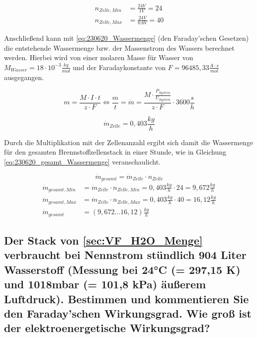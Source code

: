 \begin{align}
    n_{Zelle,Min} &= \frac{24V}{1V} = 24 \nonumber\\
    n_{Zelle,Max} &= \frac{24V}{0.6V} = 40 \nonumber
\end{align}

Anschließend kann mit \autoref{eq:230620_Wassermenge} (den Faraday'schen Gesetzen) die entstehende Wassermenge bzw. der Massenstrom des Wassers berechnet werden.
Hierbei wird von einer molaren Masse für Wasser von $M_{Wasser} = 18 \cdot 10^{-3} \frac{kg}{mol}$ und der Faradaykonstante von $F =96485,33 \frac{A\cdot s}{mol}$ ausgegangen.

\begin{equation}
    m = \frac{M \cdot I \cdot t}{z \cdot F} \Leftrightarrow \frac{m}{t} = \dot{m} = \frac{M \cdot \frac{P_{System}}{U_{System}}}{z \cdot F} \cdot 3600 \frac{s}{h}
    \label{eq:230620_Wassermenge}
\end{equation}

$$\dot{m}_{Zelle} = 0,403 \frac{kg}{h}$$

Durch die Multiplikation mit der Zellenanzahl ergibt sich damit die Wassermenge für den gesamten Brennstoffzellenstack in einer Stunde, wie in Gleichung \autoref{eq:230620_gesamt_Wassermenge} veranschaulicht.

\begin{equation}
    \dot{m}_{gesamt} = \dot{m}_{Zelle} \cdot n_{Zelle}
    \label{eq:230620_gesamt_Wassermenge}
\end{equation}
\begin{align}
    \dot{m}_{gesamt,Min} &= \dot{m}_{Zelle} \cdot n_{Zelle,Min} = 0,403 \frac{kg}{h} \cdot 24 = 9,672 \frac{kg}{h} \nonumber\\
    \dot{m}_{gesamt,Max} &= \dot{m}_{Zelle} \cdot n_{Zelle,Max} = 0,403 \frac{kg}{h} \cdot 40 = 16,12 \frac{kg}{h} \nonumber\\
    \dot{m}_{gesamt} &= (9,672 \dots 16,12) \frac{kg}{h} \nonumber
\end{align}

\subsection{Der Stack von \ref{sec:VF_H2O_Menge} verbraucht bei Nennstrom stündlich 904 Liter Wasserstoff (Messung bei 24°C (= 297,15 K) und 1018mbar (= 101,8 kPa) äußerem Luftdruck). 
Bestimmen und kommentieren Sie den Faraday'schen Wirkungsgrad. Wie groß ist der elektroenergetische Wirkungsgrad?}

